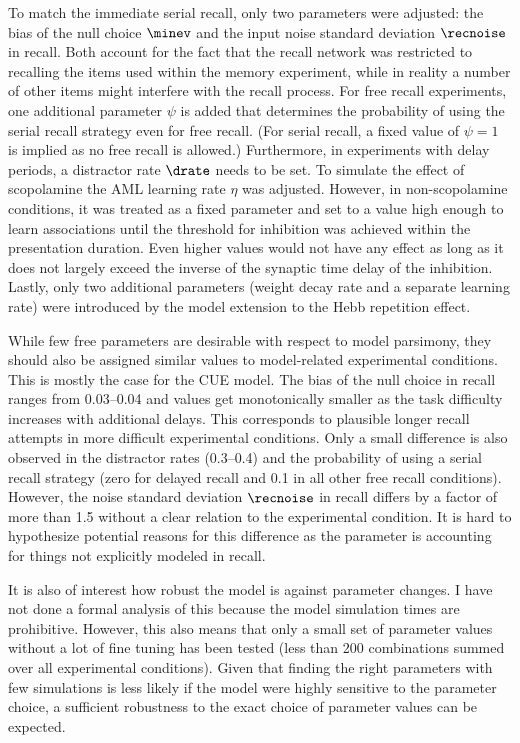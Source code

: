 To match the immediate serial recall, only two parameters were adjusted: the bias of the null choice $\minev$ and the input noise standard deviation $\recnoise$ in recall.
Both account for the fact that the recall network was restricted to recalling the items used within the memory experiment, while in reality a number of other items might interfere with the recall process.
For free recall experiments, one additional parameter $\psi$ is added that determines the probability of using the serial recall strategy even for free recall.
(For serial recall, a fixed value of $\psi = 1$ is implied as no free recall is allowed.)
Furthermore, in experiments with delay periods, a distractor rate $\drate$ needs to be set.
To simulate the effect of scopolamine the AML learning rate $\eta$ was adjusted.
However, in non-scopolamine conditions, it was treated as a fixed parameter and set to a value high enough to learn associations until the threshold for inhibition was achieved within the presentation duration.
Even higher values would not have any effect as long as it does not largely exceed the inverse of the synaptic time delay of the inhibition.
Lastly, only two additional parameters (weight decay rate and a separate learning rate) were introduced by the model extension to the Hebb repetition effect.

While few free parameters are desirable with respect to model parsimony, they should also be assigned similar values to model-related experimental conditions.
This is mostly the case for the CUE model.
The bias of the null choice in recall ranges from \numrange{0.03}{0.04} and values get monotonically smaller as the task difficulty increases with additional delays.
This corresponds to plausible longer recall attempts in more difficult experimental conditions.
Only a small difference is also observed in the distractor rates (\numrange{0.3}{0.4}) and the probability of using a serial recall strategy (zero for delayed recall and \num{0.1} in all other free recall conditions).
However, the noise standard deviation $\recnoise$ in recall differs by a factor of more than \num{1.5} without a clear relation to the experimental condition.
It is hard to hypothesize potential reasons for this difference as the parameter is accounting for things not explicitly modeled in recall.

It is also of interest how robust the model is against parameter changes.
I have not done a formal analysis of this because the model simulation times are prohibitive.
However, this also means that only a small set of parameter values without a lot of fine tuning has been tested (less than \num{200} combinations summed over all experimental conditions).
Given that finding the right parameters with few simulations is less likely if the model were highly sensitive to the parameter choice, a sufficient robustness to the exact choice of parameter values can be expected.

